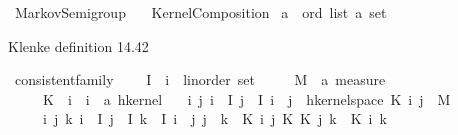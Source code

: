 %
\begin{isabellebody}%
%
%
\isadelimtheory
%
\endisadelimtheory
%
\isatagtheory
{}\isamarkupfalse%
\ Markov{\isacharunderscore}{\kern0pt}Semigroup\isanewline
\ \ \ Kernel{\isacharunderscore}{\kern0pt}Composition\isanewline
{}%
\endisatagtheory
{\isafoldtheory}%
%
\isadelimtheory
\isanewline
%
\endisadelimtheory
\isanewline
{}\isamarkupfalse%
\ {\isachardoublequoteopen}{\isacharparenleft}{\kern0pt}{\isacharprime}{\kern0pt}a\ {\isacharcolon}{\kern0pt}{\isacharcolon}{\kern0pt}\ ord{\isacharparenright}{\kern0pt}\ list{\isachardoublequoteclose}\ {\isachardoublequoteopen}{\isacharprime}{\kern0pt}a\ set{\isachardoublequoteclose}%
\begin{isamarkuptext}%
Klenke definition 14.42%
\end{isamarkuptext}\isamarkuptrue%
\isamarkupfalse%
\ consistent{\isacharunderscore}{\kern0pt}family\ {\isacharequal}{\kern0pt}\isanewline
\ \ \ I\ {\isacharcolon}{\kern0pt}{\isacharcolon}{\kern0pt}\ {\isachardoublequoteopen}{\isacharprime}{\kern0pt}i\ {\isacharcolon}{\kern0pt}{\isacharcolon}{\kern0pt}\ linorder\ set{\isachardoublequoteclose}\isanewline
\ \ \ \ \ M\ {\isacharcolon}{\kern0pt}{\isacharcolon}{\kern0pt}\ {\isachardoublequoteopen}{\isacharprime}{\kern0pt}a\ measure{\isachardoublequoteclose}\isanewline
\ \ \ \ \ K\ {\isacharcolon}{\kern0pt}{\isacharcolon}{\kern0pt}\ {\isachardoublequoteopen}{\isacharprime}{\kern0pt}i\ {\isasymRightarrow}\ {\isacharprime}{\kern0pt}i\ {\isasymRightarrow}\ {\isacharprime}{\kern0pt}a\ hkernel{\isachardoublequoteclose}\isanewline
\ \ \ {\isachardoublequoteopen}{\isasymAnd}i\ j{\isachardot}{\kern0pt}\ {\isasymlbrakk}i\ {\isasymin}\ I{\isacharsemicolon}{\kern0pt}\ j\ {\isasymin}\ I{\isacharsemicolon}{\kern0pt}\ i\ {\isacharless}{\kern0pt}\ j{\isasymrbrakk}\ {\isasymLongrightarrow}\ hkernel{\isacharunderscore}{\kern0pt}space\ {\isacharparenleft}{\kern0pt}K\ i\ j{\isacharparenright}{\kern0pt}\ {\isacharequal}{\kern0pt}\ M{\isachardoublequoteclose}\isanewline
\ \ \ \ \ {\isachardoublequoteopen}{\isasymAnd}i\ j\ k{\isachardot}{\kern0pt}\ {\isasymlbrakk}i\ {\isasymin}\ I{\isacharsemicolon}{\kern0pt}\ j\ {\isasymin}\ I{\isacharsemicolon}{\kern0pt}\ k\ {\isasymin}\ I{\isacharsemicolon}{\kern0pt}\ i\ {\isacharless}{\kern0pt}\ j{\isacharsemicolon}{\kern0pt}\ j\ {\isacharless}{\kern0pt}\ k{\isasymrbrakk}\ {\isasymLongrightarrow}\ K\ i\ j\ {\isasymcirc}\isactrlsub K\ K\ j\ k\ {\isacharequal}{\kern0pt}\ K\ i\ k{\isachardoublequoteclose}\isanewline

\end{isabellebody}
